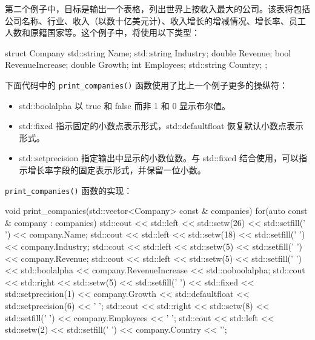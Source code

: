 第二个例子中，目标是输出一个表格，列出世界上按收入最大的公司。该表将包括公司名称、行业、收入（以数十亿美元计）、收入增长的增减情况、增长率、员工人数和原籍国家等。这个例子中，将使用以下类型：

\begin{cpp}
struct Company
{
    std::string Name;
    std::string Industry;
    double      Revenue;
    bool        RevenueIncrease;
    double      Growth;
    int         Employees;
    std::string Country;
};
\end{cpp}

下面代码中的 \verb|print_companies()| 函数使用了比上一个例子更多的操纵符：

\begin{itemize}
\item
std::boolalpha 以 true 和 false 而非 1 和 0 显示布尔值。

\item
std::fixed 指示固定的小数点表示形式，std::defaultfloat 恢复默认小数点表示形式。

\item
std::setprecision 指定输出中显示的小数位数。与 std::fixed 结合使用，可以指示增长率字段的固定表示形式，并保留一位小数。
\end{itemize}

\verb|print_companies()| 函数的实现：

\begin{cpp}
void print_companies(std::vector<Company> const & companies)
{
    for(auto const & company : companies)
    {
        std::cout << std::left << std::setw(26) << std::setfill(' ')
                  << company.Name;
        std::cout << std::left << std::setw(18) << std::setfill(' ')
                  << company.Industry;
        std::cout << std::left << std::setw(5) << std::setfill(' ')
                  << company.Revenue;
        std::cout << std::left << std::setw(5) << std::setfill(' ')
                  << std::boolalpha << company.RevenueIncrease
                  << std::noboolalpha;
        std::cout << std::right << std::setw(5) << std::setfill(' ')
                  << std::fixed << std::setprecision(1) << company.Growth
                  << std::defaultfloat << std::setprecision(6) << ' ';
        std::cout << std::right << std::setw(8) << std::setfill(' ')
                  << company.Employees << ' ';
        std::cout << std::left << std::setw(2) << std::setfill(' ')
                  << company.Country
                  << '\n';
    }
}
\end{cpp}

